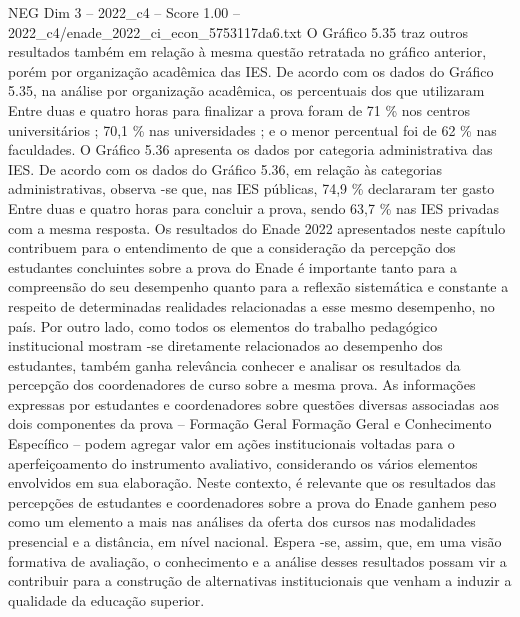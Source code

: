 \begin{textsample}{NEG Dim 3 – 2022\_c4 – Score 1.00 – 2022\_c4/enade\_2022\_ci\_econ\_5753117da6.txt}
O Gráfico 5.35 traz outros resultados também em relação à mesma questão retratada no gráfico anterior, porém por organização acadêmica das IES.
De acordo com os dados do Gráfico 5.35, na análise por organização acadêmica, os percentuais dos que utilizaram Entre duas e quatro horas para finalizar a prova foram de 71 \% nos centros universitários ; 70,1 \% nas universidades ; e o menor percentual foi de 62 \% nas faculdades.
O Gráfico 5.36 apresenta os dados por categoria administrativa das IES.
De acordo com os dados do Gráfico 5.36, em relação às categorias administrativas, observa -se que, nas IES públicas, 74,9 \% declararam ter gasto Entre duas e quatro horas para concluir a prova, sendo 63,7 \% nas IES privadas com a mesma resposta.
Os resultados do Enade 2022 apresentados neste capítulo contribuem para o entendimento de que a consideração da percepção dos estudantes concluintes sobre a prova do Enade é importante tanto para a compreensão do seu desempenho quanto para a reflexão sistemática e constante a respeito de determinadas realidades relacionadas a esse mesmo desempenho, no país.
Por outro lado, como todos os elementos do trabalho pedagógico institucional mostram -se diretamente relacionados ao desempenho dos estudantes, também ganha relevância conhecer e analisar os resultados da percepção dos coordenadores de curso sobre a mesma prova.
As informações expressas por estudantes e coordenadores sobre questões diversas associadas aos dois componentes da prova – Formação Geral Formação Geral e Conhecimento Específico – podem agregar valor em ações institucionais voltadas para o aperfeiçoamento do instrumento avaliativo, considerando os vários elementos envolvidos em sua elaboração.
Neste contexto, é relevante que os resultados das percepções de estudantes e coordenadores sobre a prova do Enade ganhem peso como um elemento a mais nas análises da oferta dos cursos nas modalidades presencial e a distância, em nível nacional.
Espera -se, assim, que, em uma visão formativa de avaliação, o conhecimento e a análise desses resultados possam vir a contribuir para a construção de alternativas institucionais que venham a induzir a qualidade da educação superior.

\end{textsample}
